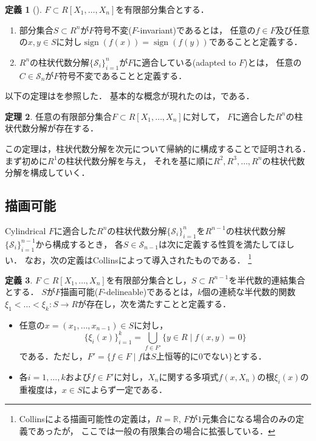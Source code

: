 \documentclass[uplatex, dvipdfmx]{jsarticle}
\numberwithin{equation}{section}
\newcommand{\R}{\mathbb{R}}
\newcommand{\map}[3]{{#1}\colon{#2}\rightarrow{#3}}
\DeclareMathOperator{\sign}{sign}
\theoremstyle{definition}
\newtheorem{definition}{定義}[section]
\newtheorem{theorem}[definition]{定理}
\begin{document}
\begin{definition}[{\cite[Definition 5.5]{MR2248869}}]
     $F \subset R[X_1, \dots, X_n]$を有限部分集合とする．
     \begin{enumerate}
          \item 部分集合$S \subset R^n$が$F$符号不変($F$-invariant)であるとは，
          任意の$f \in F$及び任意の$x,y \in S$に対し$\sign(f(x))=\sign(f(y))$であることと定義する．

          \item $R^n$の柱状代数分解$\{\mathcal{S}_i\}_{i=1}^n$が$F$に適合している(adapted to $F$)とは，
          任意の$C \in \mathcal{S}_n$が$F$符号不変であることと定義する．
     \end{enumerate}
\end{definition}

以下の定理は\cite[Theorem 5.6]{MR2248869}を参照した．
基本的な概念が現れたのは，\cite{MR0403962}である．
\begin{theorem} \label{theorem:cad}
     任意の有限部分集合$F \subset R[X_1, \dots, X_n]$に対して，
     $F$に適合した$R^n$の柱状代数分解が存在する．
\end{theorem}

この定理は，柱状代数分解を次元について帰納的に構成することで証明される．
まず初めに$R^1$の柱状代数分解を与え，
それを基に順に$R^2, R^3, \dots, R^n$の柱状代数分解を構成していく．

\subsection{描画可能}Cylindrical 
$F$に適合した$R^n$の柱状代数分解$\{\mathcal{S}_i\}_{i=1}^n$を$R^{n-1}$の柱状代数分解$\{\mathcal{S}_i\}_{i=1}^{n-1}$から構成するとき，
各$S \in \mathcal{S}_{n-1}$は次に定義する性質を満たしてほしい．
なお，次の定義はCollins\cite{MR0403962}によって導入されたものである．
\footnote{
     Collins\cite{MR0403962}による描画可能性の定義は，$R=\R$, $F$が$1$元集合になる場合のみの定義であったが，
     ここでは一般の有限集合の場合に拡張している．
}

\begin{definition} 
     $F \subset R[X_1, \dots, X_n]$を有限部分集合とし，$S \subset R^{n-1}$を半代数的連結集合とする．
     $S$が$F$描画可能($F$-delineable)であるとは，$k$個の連続な半代数的関数$\map{\xi_1<\dots<\xi_k}{S}{R}$が存在し，次を満たすことと定義する．
     \begin{itemize}
          \item 任意の$ x = (x_1, \dots, x_{n-1}) \in S $に対し，
          \begin{equation}
               \{\xi_i(x)\}_{i=1}^k = \bigcup_{f \in F'}\{y \in R \mid f(x,y)=0\}
          \end{equation}
          である．ただし，$F' = \{f \in F \mid \text{$f$は$S$上恒等的に$0$でない}\}$とする．
          \item 各$i=1, \dots, k$および$f \in F'$に対し，$X_n$に関する多項式$f(x,X_n)$の根$\xi_i(x)$の重複度は，$x\in S$によらず一定である．
     \end{itemize}
\end{definition}
\end{document}
